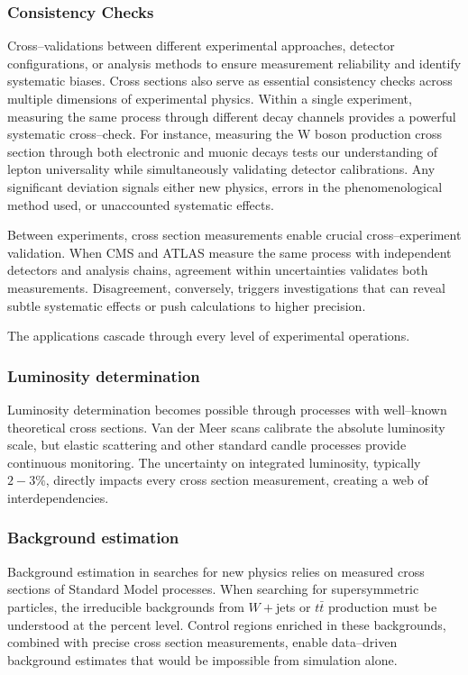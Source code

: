 \begin{definition}
        \subsubsection{Consistency Checks}
            Cross--validations between different experimental approaches, detector configurations, or analysis methods to ensure measurement reliability and identify systematic biases.
            Cross sections also serve as essential consistency checks across multiple dimensions of experimental physics.
            Within a single experiment, measuring the same process through different decay channels provides a powerful systematic cross--check.
            For instance, measuring the W boson production cross section through both electronic and muonic decays tests our understanding of lepton universality while simultaneously validating detector calibrations.
            Any significant deviation signals either new physics, errors in the phenomenological method used, or unaccounted systematic effects.
            
            Between experiments, cross section measurements enable crucial cross--experiment validation.
            When CMS and ATLAS measure the same process with independent detectors and analysis chains, agreement within uncertainties validates both measurements.
            Disagreement, conversely, triggers investigations that can reveal subtle systematic effects or push calculations to higher precision.

            The applications cascade through every level of experimental operations.
        \subsubsection{Luminosity determination}
            Luminosity determination becomes possible through processes with well--known theoretical cross sections.
            Van der Meer scans calibrate the absolute luminosity scale, but elastic scattering and other standard candle processes provide continuous monitoring.
            The uncertainty on integrated luminosity, typically \(2-3\%\), directly impacts every cross section measurement, creating a web of interdependencies.
            
        \subsubsection{Background estimation}
            Background estimation in searches for new physics relies on measured cross sections of Standard Model processes.
            When searching for supersymmetric particles, the irreducible backgrounds from \(W+\)jets or \(t\bar t\) production must be understood at the percent level.
            Control regions enriched in these backgrounds, combined with precise cross section measurements, enable data--driven background estimates that would be impossible from simulation alone.

\end{definition}
